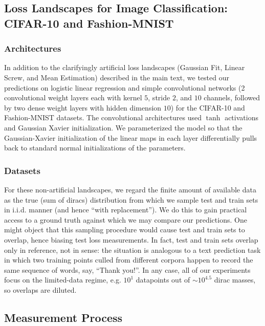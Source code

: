 \documentclass{article}
\theoremstyle{plain}
\theoremstyle{definition}
\begin{document}
    \subsection{Loss Landscapes for Image Classification: CIFAR-10 and Fashion-MNIST}
        \subsubsection*{Architectures}
            In addition to the clarifyingly artificial loss landscapes
            (Gaussian Fit, Linear Screw, and Mean Estimation) described in the
            main text, we tested our predictions on logistic linear regression
            and simple convolutional networks (2 convolutional weight layers
            each with kernel $5$, stride $2$, and $10$ channels, followed by
            two dense weight layers with hidden dimension $10$) for the
            CIFAR-10 and Fashion-MNIST datasets.  The convolutional
            architectures used $\tanh$ activations and Gaussian Xavier
            initialization.  We parameterized the model so that the
            Gaussian-Xavier initialization of the linear maps in each layer
            differentially pulls back to standard normal initializations of the
            parameters.
            
        \subsubsection*{Datasets}
            For these non-artificial landscapes, we regard the finite amount of
            available data as the true (sum of diracs) distribution from which
            we sample test and train sets in i.i.d.  manner (and hence ``with
            replacement'').  We do this to gain practical access to a ground
            truth against which we may compare our predictions.  One might
            object that this sampling procedure would cause test and train sets
            to overlap, hence biasing test loss measurements.  In fact, test
            and train sets overlap only in reference, not in sense: the
            situation is analogous to a text prediction task in which two
            training points culled from different corpora happen to record the
            same sequence of words, say, ``Thank you!''.  In any case, all of
            our experiments focus on the limited-data regime, e.g. $10^1$
            datapoints out of $\sim 10^{4.5}$ dirac masses, so overlaps are
            diluted. 

    \subsection{Measurement Process}
\end{document}
